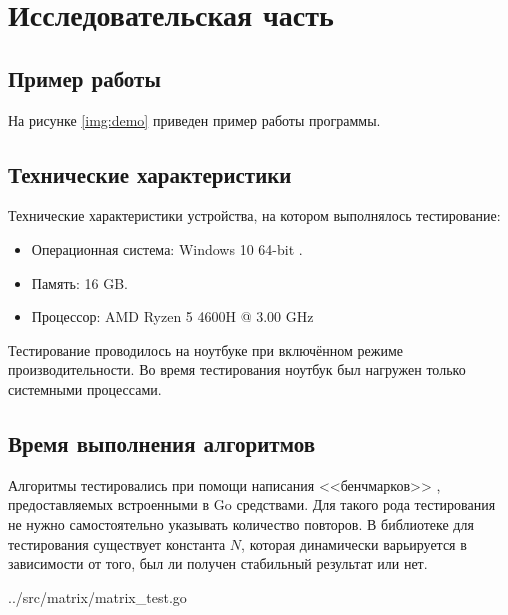 \chapter{Исследовательская часть}

\section{Пример работы}
На рисунке \ref{img:demo} приведен пример работы программы.

\section{Технические характеристики}

Технические характеристики устройства, на котором выполнялось тестирование:

\begin{itemize}
	\item Операционная система: Windows 10 64-bit \cite{windows}.
	\item Память: 16 GB.
	\item Процессор: AMD Ryzen 5 4600H \cite{amd} @ 3.00 GHz
\end{itemize}

Тестирование проводилось на ноутбуке при включённом режиме производительности. Во время тестирования ноутбук был нагружен только системными процессами.

\section{Время выполнения алгоритмов}

Алгоритмы тестировались при помощи написания <<бенчмарков>> \cite{gotest}, предоставляемых встроенными в Go средствами. Для такого рода тестирования не нужно самостоятельно указывать количество повторов. В библиотеке для тестирования существует константа $N$, которая динамически варьируется в зависимости от того, был ли получен стабильный результат или нет.

\begin{lstinputlisting}[
	caption={Пример реализации бенчмарка},
	label={lst:matrix_test},
	style={go},
	linerange={5-16},
	]{../src/matrix/matrix_test.go}
\end{lstinputlisting}

